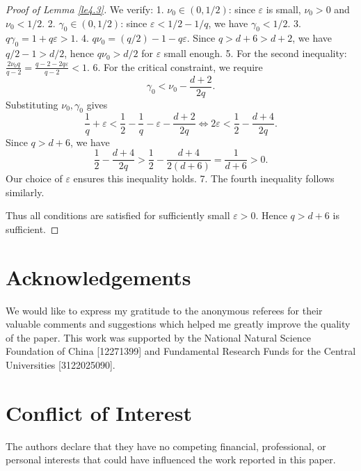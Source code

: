 \documentclass[10pt]{article}
\numberwithin{figure}{section}
\numberwithin{equation}{section}
\newcommand{\0}{{\theta}}
\begin{document}
\begin{proof}[Proof of Lemma \ref{le4.3}]
We verify:
1. $\nu_0\in(0,1/2)$: since $\varepsilon$ is small, $\nu_0>0$ and $\nu_0<1/2$.
2. $\gamma_0\in(0,1/2)$: since $\varepsilon<1/2-1/q$, we have $\gamma_0<1/2$.
3. $q\gamma_0=1+q\varepsilon>1$.
4. $q\nu_0=(q/2)-1-q\varepsilon$. Since $q>d+6>d+2$, we have $q/2-1>d/2$, hence $q\nu_0>d/2$ for $\varepsilon$ small enough.
5. For the second inequality: $\frac{2\nu_0 q}{q-2}=\frac{q-2-2q\varepsilon}{q-2}<1$.
6. For the critical constraint, we require
$$
\gamma_0 < \nu_0-\frac{d+2}{2q}.
$$
Substituting $\nu_0,\gamma_0$ gives
$$
\frac1q+\varepsilon < \frac12-\frac1q-\varepsilon-\frac{d+2}{2q}
\iff
2\varepsilon < \frac12-\frac{d+4}{2q}.
$$
Since $q>d+6$, we have
$$
\frac12-\frac{d+4}{2q}>\frac12-\frac{d+4}{2(d+6)}=\frac{1}{d+6}>0.
$$
Our choice of $\varepsilon$ ensures this inequality holds.
7. The fourth inequality follows similarly.

Thus all conditions are satisfied for sufficiently small $\varepsilon>0$. Hence $q>d+6$ is sufficient.
\end{proof}

\section*{Acknowledgements}
We would like to express my gratitude to the anonymous referees for their valuable comments and suggestions which helped me greatly improve the
quality of the paper. This work was supported by the National Natural Science Foundation of China [12271399] and Fundamental Research Funds for the Central Universities [3122025090].
\section*{Conflict of Interest}
The authors declare that they have no competing financial, professional, or personal interests that could have influenced the work reported in this paper.
\end{document}
